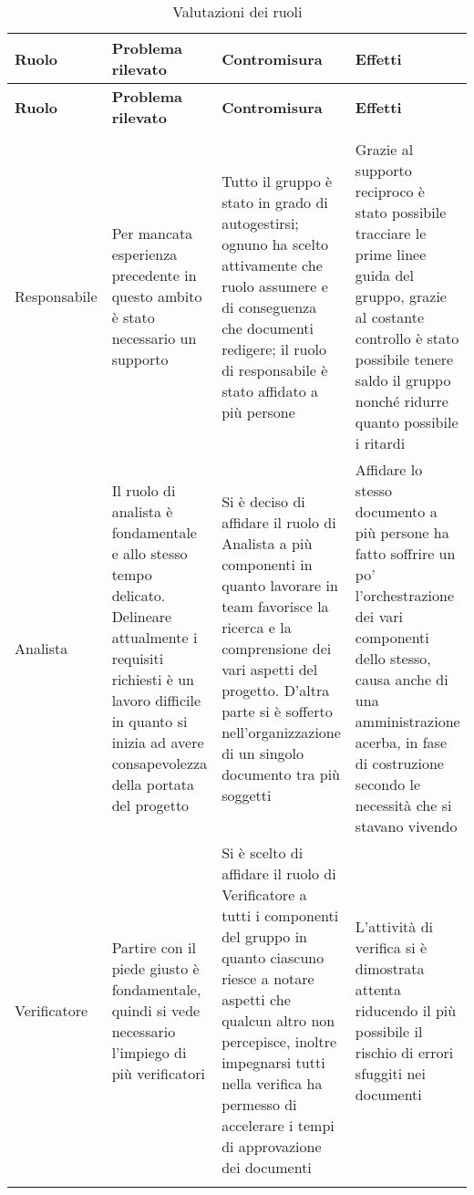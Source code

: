 \documentclass[../piano_di_qualifica.tex]{subfiles}
\begin{document}
\begin{center}
	\begin{longtable}{|p{2.5cm}|p{4.5cm}|p{4.5cm}|p{4.5cm}|}
		\hline
		\rowcolor{lightgray}
		{\textbf{Ruolo}} & {\textbf{Problema rilevato}} & {\textbf{Contromisura}} & {\textbf{Effetti}} \\
		\hline
		\endfirsthead
		\hline
		\rowcolor{lightgray}
		{\textbf{Ruolo}} & {\textbf{Problema rilevato}} & {\textbf{Contromisura}} & {\textbf{Effetti}} \\
		\hline
		\endhead

		\hline
		\rowcolor{white}
		\multicolumn{3}{|c|}{\emph{Continua alla pagina successiva...}} \\
		\hline
		\endfoot
		\endlastfoot

		Responsabile & Per mancata esperienza precedente in questo ambito è stato necessario un supporto & Tutto il gruppo è stato in grado di autogestirsi; ognuno ha scelto attivamente che ruolo assumere e di conseguenza che documenti redigere; il ruolo di responsabile è stato affidato a più persone & Grazie al supporto reciproco è stato possibile tracciare le prime linee guida del gruppo, grazie al costante controllo è stato possibile tenere saldo il gruppo nonché ridurre quanto possibile i ritardi \\
		Analista & Il ruolo di analista è fondamentale e allo stesso tempo delicato. Delineare attualmente i requisiti richiesti è un lavoro difficile in quanto si inizia ad avere consapevolezza della portata del progetto & Si è deciso di affidare il ruolo di Analista a più componenti in quanto lavorare in team favorisce la ricerca e la comprensione dei vari aspetti del progetto. D'altra parte si è sofferto nell'organizzazione di un singolo documento tra più soggetti & Affidare lo stesso documento a più persone ha fatto soffrire un po’ l’orchestrazione dei vari componenti dello stesso, causa anche di una amministrazione acerba, in fase di costruzione secondo le necessità che si stavano vivendo \\
		Verificatore & Partire con il piede giusto è fondamentale, quindi si vede necessario l'impiego di più verificatori & Si è scelto di affidare il ruolo di Verificatore a tutti i componenti del gruppo in quanto ciascuno riesce a notare aspetti che qualcun altro non percepisce, inoltre impegnarsi tutti nella verifica ha permesso di accelerare i tempi di approvazione dei documenti & L’attività di verifica si è dimostrata attenta riducendo il più possibile il rischio di errori sfuggiti nei documenti \\
		\hline
		\rowcolor{white}
		\caption{Valutazioni dei ruoli}
	\end{longtable}
\end{center}
\end{document}
